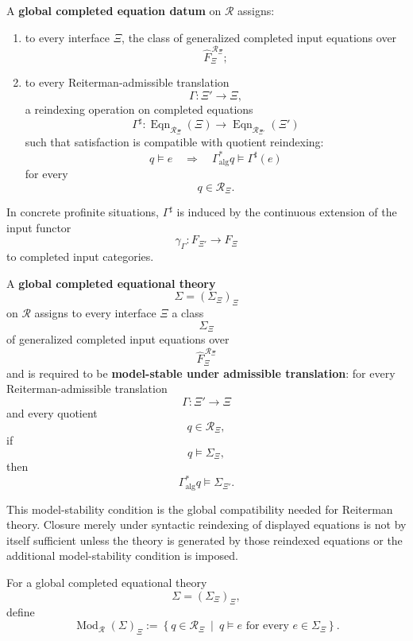 \begin{definition}
\label{def:reiterman-global-completed-equation-datum}
A \textbf{global completed equation datum} on \(\mathcal R\) assigns:
\begin{enumerate}
\item to every interface \(\Xi\), the class of generalized completed input
equations over
\[
\widehat F_\Xi^{\,\mathcal R_\Xi};
\]
\item to every Reiterman-admissible translation
\[
\Gamma:\Xi'\to\Xi,
\]
a reindexing operation on completed equations
\[
\Gamma^\sharp:
\operatorname{Eqn}_{\mathcal R_\Xi}(\Xi)
\to
\operatorname{Eqn}_{\mathcal R_{\Xi'}}(\Xi')
\]
such that satisfaction is compatible with quotient reindexing:
\[
q\models e
\quad\Longrightarrow\quad
\Gamma_{\mathrm{alg}}^\ast q\models \Gamma^\sharp(e)
\]
for every
\[
q\in\mathcal R_\Xi.
\]
\end{enumerate}
\end{definition}

In concrete profinite situations, \(\Gamma^\sharp\) is induced by the
continuous extension of the input functor
\[
\gamma_\Gamma:F_{\Xi'}\to F_\Xi
\]
to completed input categories.

\begin{definition}
\label{def:reiterman-global-completed-equational-theory}
A \textbf{global completed equational theory}
\[
\Sigma=(\Sigma_\Xi)_\Xi
\]
on \(\mathcal R\) assigns to every interface \(\Xi\) a class
\[
\Sigma_\Xi
\]
of generalized completed input equations over
\[
\widehat F_\Xi^{\,\mathcal R_\Xi}
\]
and is required to be \textbf{model-stable under admissible translation}:
for every Reiterman-admissible translation
\[
\Gamma:\Xi'\to\Xi
\]
and every quotient
\[
q\in\mathcal R_\Xi,
\]
if
\[
q\models \Sigma_\Xi,
\]
then
\[
\Gamma_{\mathrm{alg}}^\ast q
\models
\Sigma_{\Xi'}.
\]
\end{definition}

This model-stability condition is the global compatibility needed for
Reiterman theory. Closure merely under syntactic reindexing of displayed
equations is not by itself sufficient unless the theory is generated by those
reindexed equations or the additional model-stability condition is imposed.

\begin{definition}
\label{def:reiterman-models-global-equational-theory}
For a global completed equational theory
\[
\Sigma=(\Sigma_\Xi)_\Xi,
\]
define
\[
\operatorname{Mod}_{\mathcal R}(\Sigma)_\Xi
:=
\left\{
q\in\mathcal R_\Xi
\ \middle|\
q\models e\text{ for every }e\in\Sigma_\Xi
\right\}.
\]
\end{definition}

